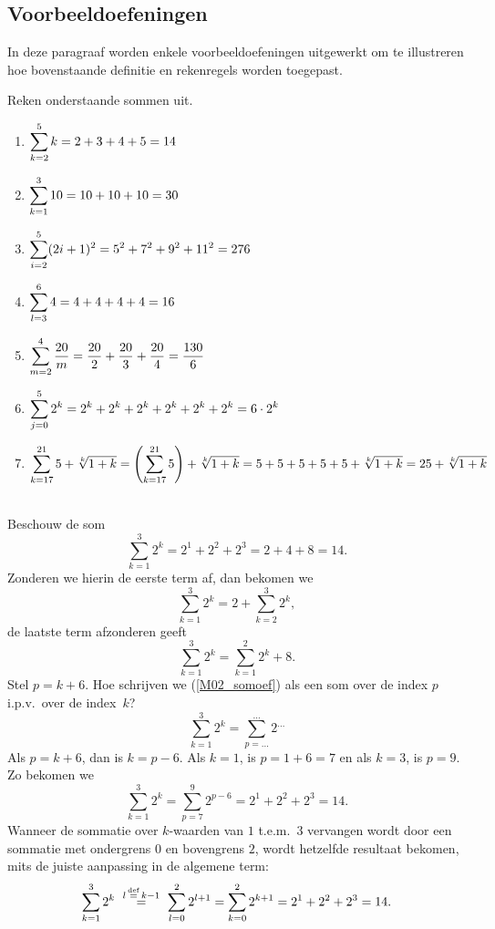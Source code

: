 \documentclass{ximera}
\begin{document}
\startletternummering
\subsection{Voorbeeldoefeningen}
In deze paragraaf worden enkele voorbeeldoefeningen uitgewerkt om
te illustreren hoe bovenstaande definitie en rekenregels worden
toegepast.
\begin{voorbeeldoefening}
Reken onderstaande sommen uit.
\begin{enumerate}
\item $\displaystyle{\sum^{5}_{k=2}k=2+3+4+5=14}$
\item $\displaystyle{\sum^{3}_{k=1}10=10+10+10=30}$
\item $\displaystyle{\sum^{5}_{i=2}(2i+1)^{2}=5^{2}+7^{2}+9^{2}+11^{2}=276}$
\item $\displaystyle{\sum^{6}_{l=3}4=4+4+4+4=16}$
\item $\displaystyle{\sum^{4}_{m=2}\frac{20}{m}=\frac{20}{2}+\frac{20}{3}+\frac{20}{4}=\frac{130}{6}}$
\item $\displaystyle{\sum^{5}_{j=0}2^k=2^k+2^k+2^k+2^k+2^k+2^k=6\cdot2^k}$
\item
$\displaystyle{\sum^{21}_{k=17}5+\sqrt[k]{1+k}=\left(\sum^{21}_{k=17}5\right)+\sqrt[k]{1+k}=5+5+5+5+5+\sqrt[k]{1+k}=25+\sqrt[k]{1+k}}$\\[-1ex]
\mbox{\ }
\end{enumerate}
\end{voorbeeldoefening}
\begin{voorbeeldoefening}
Beschouw de som
\begin{equation}\label{M02_somoef}
\sum_{k=1}^{3}2^{k}=2^{1}+2^{2}+2^{3}=2+4+8=14.
\end{equation}
Zonderen we hierin de eerste term af, dan bekomen
we\[\sum_{k=1}^{3}2^{k}=2+\sum_{k=2}^{3}2^{k},\] de laatste term
afzonderen geeft\[\sum_{k=1}^{3}2^{k}=\sum_{k=1}^{2}2^{k}+8.\]
Stel $p=k+6$. Hoe schrijven we (\ref{M02_somoef}) als een som over de
index $p$ i.p.v.~over de index~$k$?
\[\sum_{k=1}^{3}2^{k}=\sum_{p=\ldots}^{\ldots}2^{\ldots}\] Als $p=k+6$,
dan is $k=p-6$. Als $k=1$, is $p=1+6=7$ en als $k=3$, is $p=9$. Zo
bekomen we
\[\sum_{k=1}^{3}2^{k}=\sum_{p=7}^{9}2^{p-6}=2^{1}+2^{2}+2^{3}=14.\]
Wanneer de sommatie over $k$-waarden van $1$ t.e.m.~$3$ vervangen
wordt door een sommatie met ondergrens $0$ en bovengrens $2$,
wordt hetzelfde resultaat bekomen, mits de juiste aanpassing in de
algemene term:
\[\sum_{k=1}^{3}2^{k}\
\overset{l\,\overset{\mathrm{def}}{=}\,k-1}{=}\
\sum_{l=0}^{2}2^{l+1}=\sum_{k=0}^{2}2^{k+1}=2^{1}+2^{2}+2^{3}=14.\]
\end{voorbeeldoefening}
\end{document}
